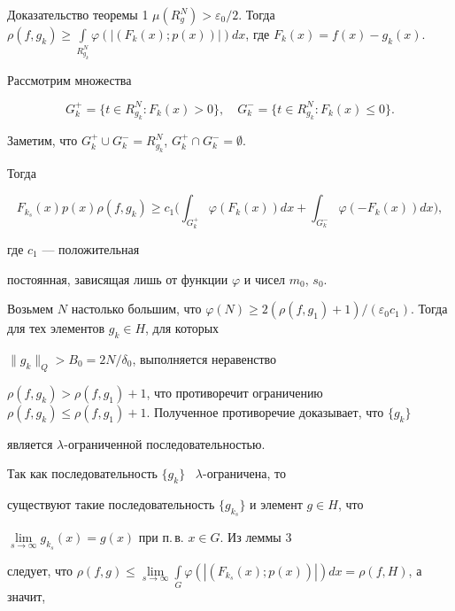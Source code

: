 \begin{pf*}{Доказательство теоремы 1}
$\mu(R^N_g)>\varepsilon_0/2$. Тогда $\rho(f,g_k)\ge\int\limits_{R^N_{g_k}} 


\varphi(|(F_k(x);p(x))|)dx$, где $F_k(x)=f(x)-g_k(x)$. 


 


Рассмотрим множества 


$$ 


G^+_k=\{t\in R^N_{g_k}:F_k(x)>0\},\quad 


G^-_k=\{t\in R^N_{g_k}:F_k(x)\le 0\}. 


$$ 


Заметим, что $G^+_k\cup G^-_k=R^N_{g_k}$, $G^+_k\cap G^-_k=\emptyset$. 


Тогда


$$


F_{k_s}(x)p(x)\rho(f,g_k)\ge c_1\bigg(\int_{G^+_k} \varphi(F_k(x))dx+ 


\int_{G^-_k} \varphi(-F_k(x))dx\bigg),


$$


где $c_1$ --- положительная 


постоянная, зависящая лишь от функции $\varphi$ и чисел $m_0$, $s_0$. 


 


Возьмем $N$ настолько большим, что $\varphi(N)\ge2(\rho(f,g_1)+1)/ 


(\varepsilon_0c_1)$. Тогда для тех элементов $g_k\in H$, для которых 


$\|g_k\|_Q>B_0=2N/\delta_0$, выполняется неравенство 


$\rho(f,g_k)>\rho(f,g_1)+1$, что противоречит ограничению $\rho(f,g_k)\le 


\rho(f,g_1)+1$. Полученное противоречие доказывает, что $\{g_k\}$ 


является $\lambda$-ограниченной последовательностью. 


 


Так как последовательность $\{g_k\}$ \ $\lambda$-ограничена, то 


существуют такие последовательность $\{g_{k_s}\}$ и элемент $g\in H$, что 


$\lim\limits_{s\to\infty}g_{k_s}(x)=g(x)$ при п.\,в. $x\in G$. Из леммы 3 


следует, что $\rho(f,g)\le \lim\limits_{s\to\infty} \int\limits_G 


\varphi(|(F_{k_s}(x);p(x))|)dx= \rho(f,H)$, а значит, 



\end{pf*}
